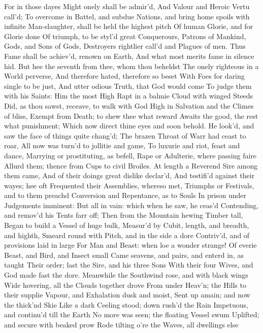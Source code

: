 \documentclass[11pt]{book}
\newcounter {last}
\begin{document}
For in those dayes Might onely shall be admir'd, 
And Valour and Heroic Vertu call'd; 
To overcome in Battel, and subdue 
Nations, and bring home spoils with infinite 
Man-slaughter, shall be held the highest pitch 
Of human Glorie, and for Glorie done 
Of triumph, to be styl'd great Conquerours, 
Patrons of Mankind, Gods, and Sons of Gods, 
Destroyers rightlier call'd and Plagues of men. 
Thus Fame shall be achiev'd, renown on Earth, 
And what most merits fame in silence hid. 
But hee the seventh from thee, whom thou beheldst 
The onely righteous in a World perverse, 
And therefore hated, therefore so beset 
With Foes for daring single to be just, 
And utter odious Truth, that God would come 
To judge them with his Saints: Him the most High 
Rapt in a balmie Cloud with winged Steeds 
Did, as thou sawst, receave, to walk with God 
High in Salvation and the Climes of bliss, 
Exempt from Death; to shew thee what reward 
Awaits the good, the rest what punishment; 
Which now direct thine eyes and soon behold. 
\quad He look'd, and saw the face of things quite chang'd; 
The brazen Throat of Warr had ceast to roar, 
All now was turn'd to jollitie and game, 
To luxurie and riot, feast and dance, 
Marrying or prostituting, as befell, 
Rape or Adulterie, where passing faire 
Allurd them; thence from Cups to civil Broiles. 
At length a Reverend Sire among them came, 
And of their doings great dislike declar'd, 
And testifi'd against their wayes; hee oft 
Frequented their Assemblies, whereso met, 
Triumphs or Festivals, and to them preachd 
Conversion and Repentance, as to Souls 
In prison under Judgements imminent: 
But all in vain: which when he saw, he ceas'd 
Contending, and remov'd his Tents farr off; 
Then from the Mountain hewing Timber tall, 
Began to build a Vessel of huge bulk, 
Measur'd by Cubit, length, and breadth, and highth, 
Smeard round with Pitch, and in the side a dore 
Contriv'd, and of provisions laid in large 
For Man and Beast: when loe a wonder strange! 
Of everie Beast, and Bird, and Insect small 
Came seavens, and pairs, and enterd in, as taught 
Their order; last the Sire, and his three Sons 
With their four Wives, and God made fast the dore. 
Meanwhile the Southwind rose, and with black wings 
Wide hovering, all the Clouds together drove 
From under Heav'n; the Hills to their supplie 
Vapour, and Exhalation dusk and moist, 
Sent up amain; and now the thick'nd Skie 
Like a dark Ceeling stood; down rush'd the Rain 
Impetuous, and continu'd till the Earth 
No more was seen; the floating Vessel swum 
Uplifted; and secure with beaked prow 
Rode tilting o're the Waves, all dwellings else 
\end{document}
